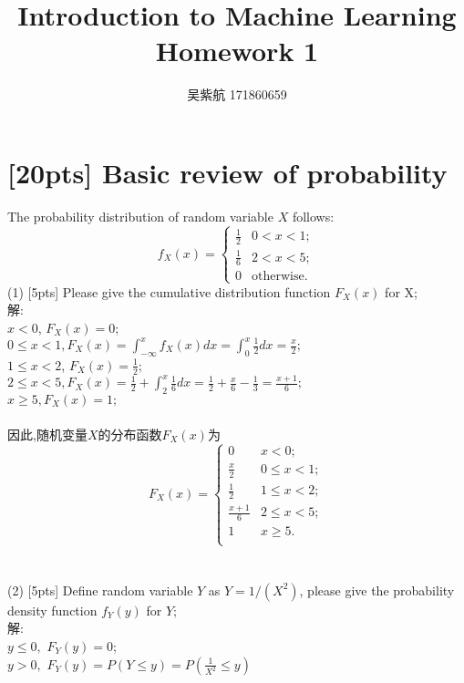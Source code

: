 \documentclass{article}
\title{Introduction to Machine Learning\\Homework 1}
\author{吴紫航 171860659}
\date{}
\begin{document}
	\maketitle
	\section{[20pts] Basic review of probability}
	The probability distribution of random variable $X$ follows:\\
	\begin{equation}
	f_X(x)=\begin{cases}
	\frac{1}{2} & 0<x<1;\\
	\frac{1}{6} & 2<x<5;\\
	0 & \text{otherwise}.
	\end{cases}
	\end{equation} 
	(1) [5pts] Please give the cumulative distribution function $F_X(x)$ for X;\\
解: \\
 $x<0$, $F_X(x)=0$;\\
$0\leq x<1, F_X(x)=\int_{-\infty}^{x}f_X(x)dx=\int_{0}^{x}\frac{1}{2}dx=\frac{x}{2};$\\
$1\leq x<2$, $F_X(x)=\frac{1}{2}$; \\
$2\leq x<5, F_X(x)=\frac{1}{2}+\int_{2}^{x}\frac{1}{6}dx=\frac{1}{2}+\frac{x}{6}-\frac{1}{3}=\frac{x+1}{6}; $ \\
$x\geq5,F_X(x)=1; $\\\\
\indent 因此,随机变量$X$的分布函数$F_X(x)$为
		\begin{equation}
		F_X(x)=\begin{cases}
			0&x<0;\\
			\frac{x}{2}&0\leq x<1;\\
			\frac{1}{2}&1\leq x<2;\\
			\frac{x+1}{6}&2\leq x<5;\\
			1&x\geq5.\\
		\end{cases}
		\end{equation}
\\\\
	(2) [5pts] Define random variable $Y$ as $Y=1/(X^2)$, please give the probability density function $f_Y(y)$ for $Y$;\\
解:\\
$y\leq0,$ $F_Y(y)=0$;\\
$y>0,$ $F_Y(y)=P(Y\leq y)=P(\frac{1}{X^2}\leq y)$\\
\end{document}
